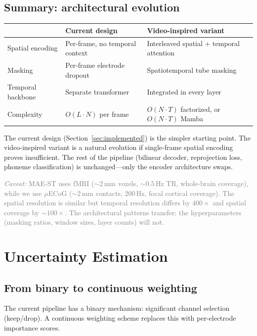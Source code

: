 \documentclass[11pt,letterpaper]{article}
\newcommand{\caveat}[1]{\par\smallskip\noindent\textcolor{gray}{\textit{Caveat:} #1}\smallskip}
\begin{document}
\subsection{Summary: architectural evolution}

\begin{table}[ht!]\centering\small
\begin{tabular}{@{}p{}p{}p{}@{}}
\toprule
& \textbf{Current design} & \textbf{Video-inspired variant} \\
\midrule
Spatial encoding & Per-frame, no temporal context & Interleaved spatial + temporal attention \\
Masking & Per-frame electrode dropout & Spatiotemporal tube masking \\
Temporal backbone & Separate transformer & Integrated in every layer \\
Complexity & $O(L \cdot N)$ per frame & $O(N \cdot T)$ factorized, or $O(N{\cdot}T)$ Mamba \\
\bottomrule
\end{tabular}
\end{table}

\noindent The current design (Section~\ref{sec:implemented}) is the simpler starting point. The video-inspired variant is a natural evolution if single-frame spatial encoding proves insufficient. The rest of the pipeline (bilinear decoder, reprojection loss, phoneme classification) is unchanged---only the encoder architecture swaps.

\caveat{MAE-ST uses fMRI (${\sim}2$\,mm voxels, ${\sim}0.5$\,Hz TR, whole-brain coverage), while we use $\mu$ECoG (${\sim}2$\,mm contacts, 200\,Hz, focal cortical coverage). The spatial resolution is similar but temporal resolution differs by $400\times$ and spatial coverage by ${\sim}100\times$. The architectural patterns transfer; the hyperparameters (masking ratios, window sizes, layer counts) will not.}


\section{Uncertainty Estimation}\label{sec:uncertainty}

\subsection{From binary to continuous weighting}

The current pipeline has a binary mechanism: significant channel selection (keep/drop). A continuous weighting scheme replaces this with per-electrode importance scores.
\end{document}
